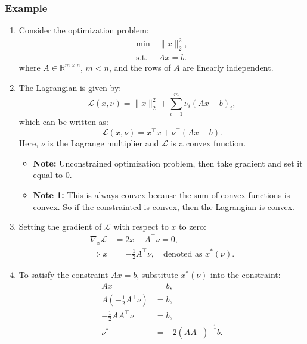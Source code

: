 \subsubsection{Example}
\begin{example}
    \begin{enumerate}
        \item Consider the optimization problem:
        \[
        \begin{aligned}
            \min \ & \|x\|_2^2, \\
            \text{s.t.} \ & A x = b.
        \end{aligned}
        \]
        where \(A \in \mathbb{R}^{m \times n}\), \(m < n\), and the rows of \(A\) are linearly independent.
        
        \item The Lagrangian is given by:
        \[
        \mathcal{L}(x, \nu) = \|x\|_2^2 + \sum_{i=1}^m \nu_i (A x - b)_i,
        \]
        which can be written as:
        \[
        \mathcal{L}(x, \nu) = x^\top x + \nu^\top (A x - b).
        \]
        Here, \(\nu\) is the Lagrange multiplier and \(\mathcal{L}\) is a convex function.
        \begin{itemize}
            \item \textbf{Note:} Unconstrained optimization problem, then take gradient and set it equal to 0. 
            \item \textbf{Note 1:} This is always convex because the sum of convex functions is convex. So if the constrainted is convex, then the Lagrangian is convex.
        \end{itemize}
    
        \item Setting the gradient of \(\mathcal{L}\) with respect to \(x\) to zero:
        \begin{align*}
            \nabla_x \mathcal{L} &= 2x + A^\top \nu = 0, \\
            \Rightarrow x &= -\frac{1}{2} A^\top \nu, \quad \text{denoted as } x^*(\nu).
        \end{align*}
        
        \item To satisfy the constraint \(A x = b\), substitute \(x^*(\nu)\) into the constraint:
        \begin{align*}
            A x &= b, \\
            A \left(-\frac{1}{2} A^\top \nu \right) &= b, \\
            -\frac{1}{2} A A^\top \nu &= b, \\
            \nu^* &= -2 (A A^\top)^{-1} b.
        \end{align*}
    

\end{enumerate}
\end{example}
